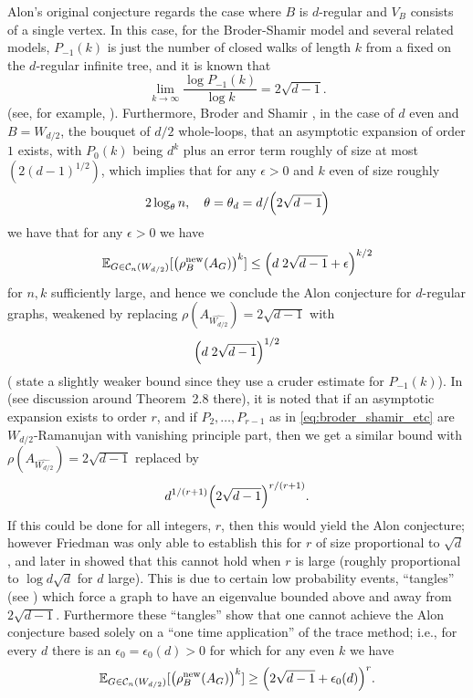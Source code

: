 \documentclass{memo-l}
\theoremstyle{plain}
\theoremstyle{definition}
\numberwithin{section}{chapter}
\numberwithin{equation}{chapter}
\newcommand{\rhonew}{\rho^{\mathrm{new}}}
\theoremstyle{plain}
\theoremstyle{definition}
\newcommand\EE{\mathbb{E}}
\newcommand\cC{\mathcal{C}}
\begin{document}
{Alon's original conjecture regards the case where $B$ is $d$-regular and
$V_B$ consists of a single vertex.
In this case, for the Broder-Shamir model and several related models,
$P_{-1}(k)$ is just the number of closed walks of length
$k$ from a fixed on the $d$-regular infinite tree, and it is known that
$$
\lim_{k\to\infty} \frac{\log P_{-1}(k)}{\log k} = 2\sqrt{d-1}.
$$
(see, for
example, \cite{kesten_symmetric_random,cartier,
mckay_spanning}).
Furthermore,
Broder and Shamir \cite{broder}, in the case of $d$ even 
and $B=W_{d/2}$, the bouquet of $d/2$ whole-loops,
that an asymptotic expansion of order $1$ exists,
with $P_0(k)$ being $d^k$ plus an error term roughly of size at
most $(2(d-1)^{1/2})$, which implies that
for any $\epsilon>0$ and $k$ even of size roughly
$$
2 \log_\theta n, \quad\theta=\theta_d=d/\Bigl( 2\sqrt{d-1}\Bigr)
$$
we have that for any $\epsilon>0$ we have
$$
\EE_{G \in \cC_n(W_{d/2})}[ \bigl( \rhonew_B(A_G) \bigr)^k ] \le
\Bigl( d\; 2\sqrt{d-1}+ \epsilon \Bigr)^{k/2}
$$
for $n,k$ sufficiently large, and hence we conclude the Alon conjecture
for $d$-regular graphs, weakened by replacing $\rho(A_{\widehat{W_{d/2}}})
=2\sqrt{d-1}$ with
$$
\Bigl( d\; 2\sqrt{d-1}\Bigr)^{1/2} 
$$
(\cite{broder} state a slightly weaker bound since they use a cruder
estimate for $P_{-1}(k)$).
In \cite{friedman_random_graphs} (see discussion around
Theorem~2.8 there), it is noted that if an
asymptotic expansion exists to order $r$, and if 
$P_2,\ldots,P_{r-1}$ as in \eqref{eq:broder_shamir_etc} are
$W_{d/2}$-Ramanujan with vanishing principle part, then we get a similar
bound with $\rho(A_{\widehat{W_{d/2}}})
=2\sqrt{d-1}$ replaced by
$$
d^{1/(r+1)} \Bigl( 2\sqrt{d-1} \Bigr)^{r/(r+1)}.
$$
If this could be done for all integers, $r$, then this would yield
the Alon conjecture; however Friedman \cite{friedman_random_graphs}
was only able to establish
this for $r$ of size proportional to $\sqrt{d}$, and later in
\cite{friedman_alon} showed that this cannot hold when $r$ is large
(roughly proportional to $\log d\sqrt{d}$ for $d$ large).
This is due to certain low probability events, ``tangles'' 
(see \cite{friedman_alon}) which force a graph to have an eigenvalue
bounded above and away from $2\sqrt{d-1}$.
Furthermore these ``tangles'' show that one cannot achieve the
Alon conjecture based solely on a ``one time application'' of
the trace method; i.e., for every $d$ there is an $\epsilon_0=\epsilon_0(d)>0$
for which for any even $k$ we have
$$
\EE_{G \in \cC_n(W_{d/2})}[ \bigl( \rhonew_B(A_G) \bigr)^k ] \ge
\Bigl( 2\sqrt{d-1} + \epsilon_0(d) \Bigr)^r.
$$

}
\end{document}
